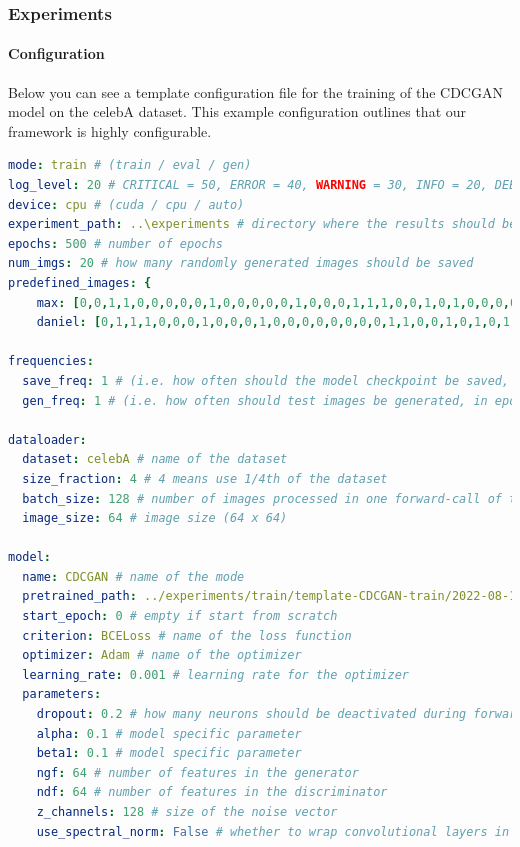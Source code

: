 \documentclass[12pt, a4paper]{article}
\begin{document}
\subsubsection{Experiments}

\paragraph{Configuration}
\label{config}

Below you can see a template configuration file for the training of the CDCGAN model on the celebA dataset.
This example configuration outlines that our framework is highly configurable. 

\begin{lstlisting}[language=yaml,
    basicstyle=\tiny,
]
mode: train # (train / eval / gen)
log_level: 20 # CRITICAL = 50, ERROR = 40, WARNING = 30, INFO = 20, DEBUG = 10, NOTSET = 0
device: cpu # (cuda / cpu / auto)
experiment_path: ..\experiments # directory where the results should be persisted
epochs: 500 # number of epochs
num_imgs: 20 # how many randomly generated images should be saved
predefined_images: {
    max: [0,0,1,1,0,0,0,0,0,1,0,0,0,0,0,1,0,0,0,1,1,1,0,0,1,0,1,0,0,0,0,1,0,0,0,0,0,0,0,1],
    daniel: [0,1,1,1,0,0,0,1,0,0,0,1,0,0,0,0,0,0,0,0,1,1,0,0,1,0,1,0,1,0,0,1,0,0,0,0,0,0,0,1]} # predefined attribute vectors for the image generation

frequencies:
  save_freq: 1 # (i.e. how often should the model checkpoint be saved, in epochs)
  gen_freq: 1 # (i.e. how often should test images be generated, in epochs)

dataloader:
  dataset: celebA # name of the dataset
  size_fraction: 4 # 4 means use 1/4th of the dataset
  batch_size: 128 # number of images processed in one forward-call of the models
  image_size: 64 # image size (64 x 64)

model:
  name: CDCGAN # name of the mode
  pretrained_path: ../experiments/train/template-CDCGAN-train/2022-08-10-10-08-52 # empty if start from scratch
  start_epoch: 0 # empty if start from scratch
  criterion: BCELoss # name of the loss function
  optimizer: Adam # name of the optimizer
  learning_rate: 0.001 # learning rate for the optimizer
  parameters:
    dropout: 0.2 # how many neurons should be deactivated during forwarding
    alpha: 0.1 # model specific parameter
    beta1: 0.1 # model specific parameter
    ngf: 64 # number of features in the generator
    ndf: 64 # number of features in the discriminator
    z_channels: 128 # size of the noise vector
    use_spectral_norm: False # whether to wrap convolutional layers in spectral_norm or not
\end{lstlisting}
\end{document}

